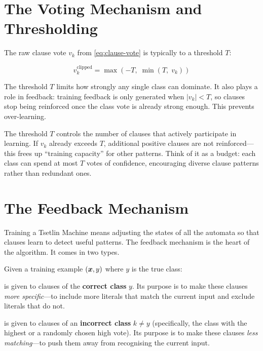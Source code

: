 \section{The Voting Mechanism and Thresholding}
\label{sec:voting}

The raw clause vote $v_k$ from \cref{eq:clause-vote} is typically
 to a threshold $T$:

\begin{equation}
  v_k^{\text{clipped}} = \max(-T, \; \min(T, \; v_k))
  \label{eq:clipped-vote}
\end{equation}

The threshold $T$ limits how strongly any single class can dominate.
It also plays a role in feedback: training feedback is only generated
when $|v_k| < T$, so clauses stop being reinforced once the class
vote is already strong enough. This prevents over-learning.

\begin{keyinsight}
The threshold $T$ controls the number of clauses that actively
participate in learning. If $v_k$ already exceeds $T$, additional
positive clauses are not reinforced---this frees up ``training
capacity'' for other patterns. Think of it as a budget: each class
can spend at most $T$ votes of confidence, encouraging diverse
clause patterns rather than redundant ones.
\end{keyinsight}


\section{The Feedback Mechanism}
\label{sec:feedback}

Training a Tsetlin Machine means adjusting the states of all the
automata so that clauses learn to detect useful patterns. The feedback
mechanism is the heart of the algorithm. It comes in two types.

Given a training example $(\bm{x}, y)$ where $y$ is the true class:

\begin{description}[leftmargin=1em]
  \item[Type~I feedback] is given to clauses of the \textbf{correct
    class} $y$. Its purpose is to make these clauses \emph{more
    specific}---to include more literals that match the current input
    and exclude literals that do not.

  \item[Type~II feedback] is given to clauses of an
    \textbf{incorrect class} $k \neq y$ (specifically, the class
    with the highest or a randomly chosen high vote). Its purpose is
    to make these clauses \emph{less matching}---to push them away
    from recognising the current input.
\end{description}


